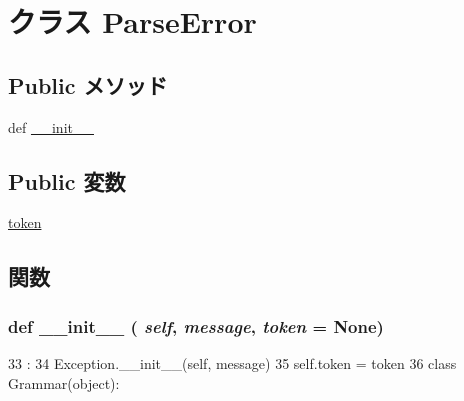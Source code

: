\hypertarget{classm5_1_1util_1_1grammar_1_1ParseError}{
\section{クラス ParseError}
\label{classm5_1_1util_1_1grammar_1_1ParseError}
}
\subsection*{Public メソッド}
\begin{DoxyCompactItemize}
\item 
def \hyperlink{classm5_1_1util_1_1grammar_1_1ParseError_ac775ee34451fdfa742b318538164070e}{\_\-\_\-init\_\-\_\-}
\end{DoxyCompactItemize}
\subsection*{Public 変数}
\begin{DoxyCompactItemize}
\item 
\hyperlink{classm5_1_1util_1_1grammar_1_1ParseError_a87da3d8264af1c9427605148f20dd9c4}{token}
\end{DoxyCompactItemize}


\subsection{関数}
\hypertarget{classm5_1_1util_1_1grammar_1_1ParseError_ac775ee34451fdfa742b318538164070e}{
\subsubsection[{\_\-\_\-init\_\-\_\-}]{\setlength{\rightskip}{0pt plus 5cm}def \_\-\_\-init\_\-\_\- ( {\em self}, \/   {\em message}, \/   {\em token} = {\ttfamily None})}}
\label{classm5_1_1util_1_1grammar_1_1ParseError_ac775ee34451fdfa742b318538164070e}



\begin{DoxyCode}
33                                            :
34         Exception.__init__(self, message)
35         self.token = token
36 
class Grammar(object):
\end{DoxyCode}


